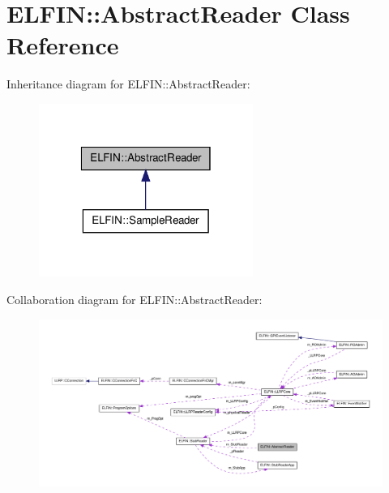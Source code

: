 \hypertarget{class_e_l_f_i_n_1_1_abstract_reader}{\section{E\-L\-F\-I\-N\-:\-:Abstract\-Reader Class Reference}
\label{class_e_l_f_i_n_1_1_abstract_reader}
}


Inheritance diagram for E\-L\-F\-I\-N\-:\-:Abstract\-Reader\-:
\nopagebreak
\begin{figure}[H]
\begin{center}
\leavevmode
\includegraphics[width=198pt]{class_e_l_f_i_n_1_1_abstract_reader__inherit__graph}
\end{center}
\end{figure}


Collaboration diagram for E\-L\-F\-I\-N\-:\-:Abstract\-Reader\-:
\nopagebreak
\begin{figure}[H]
\begin{center}
\leavevmode
\includegraphics[width=350pt]{class_e_l_f_i_n_1_1_abstract_reader__coll__graph}
\end{center}
\end{figure}
